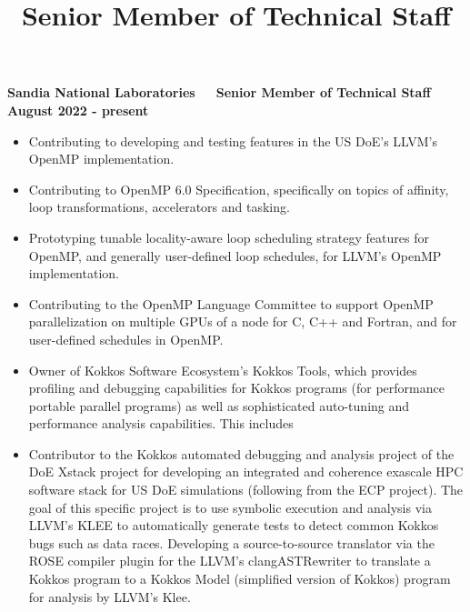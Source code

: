 \title{Senior Member of Technical Staff}
\textbf{{Sandia National Laboratories $\>$$\>$$\>$$\>$ Senior Member of Technical Staff $\>$$\>$$\>$$\>$August 2022 - present}}

\begin{itemize}
\item Contributing to developing and testing features in the US DoE's LLVM's OpenMP implementation.
\item Contributing to OpenMP 6.0 Specification, specifically on topics of affinity, loop transformations, accelerators and tasking.
\item Prototyping tunable locality-aware loop scheduling strategy features for OpenMP, and generally user-defined loop schedules, for LLVM's OpenMP implementation.  
\item Contributing to the OpenMP Language Committee to support OpenMP parallelization on multiple GPUs of a node for C, C++ and Fortran, and for user-defined schedules in OpenMP.
\item Owner of Kokkos Software Ecosystem's Kokkos Tools, which provides profiling and debugging capabilities for Kokkos programs (for performance portable parallel programs) as well as sophisticated auto-tuning and performance analysis capabilities. This includes 
\item Contributor to the Kokkos automated debugging and analysis project of the DoE Xstack project for developing an integrated and coherence exascale HPC software stack for US DoE simulations (following from the ECP project). The goal of this specific project is to use symbolic execution and analysis via LLVM's KLEE to automatically generate tests to detect common Kokkos bugs such as data races. Developing a source-to-source translator via the ROSE compiler plugin for the LLVM's clangASTRewriter to translate a Kokkos program to a Kokkos Model (simplified version of Kokkos) program for analysis by LLVM's Klee. 

\end{itemize}


